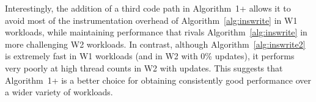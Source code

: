 
Interestingly, the addition of a third code path in Algorithm~1+ allows it to avoid most of the instrumentation overhead of Algorithm~\ref{alg:inswrite} in W1 workloads, while maintaining performance that rivals Algorithm~\ref{alg:inswrite} in more challenging W2 workloads.
In contrast, although Algorithm~\ref{alg:inswrite2} is extremely fast in W1 workloads (and in W2 with 0\% updates), it performs very poorly at high thread counts in W2 with updates.
This suggests that Algorithm~1+ is a better choice for obtaining consistently good performance over a wider variety of workloads.

